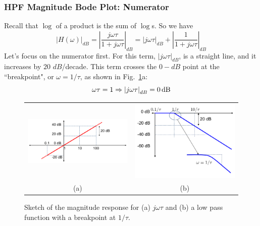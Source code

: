 \subsubsection{HPF Magnitude Bode Plot: Numerator}
Recall that $\log$ of a product is the sum of $\log$s.  So we have
    \begin{equation}
        {\left| {H(\omega )} \right|_{dB}} = {\left| {\frac{{j\omega \tau }}{{1 + j\omega \tau }}} \right|_{dB}} = {\left| {j\omega \tau } \right|_{dB}} + {\left| {\frac{1}{{1 + j\omega \tau }}} \right|_{dB}}
    \end{equation}
Let's focus on the numerator first.  For this term, $\left|j\omega \tau  \right|_{dB} $, is a straight line, and it increases by $20$ $dB$/decade.  This term crosses the $0-dB$ point at the ``breakpoint", or $\omega = 1/\tau$, as shown in Fig.~\ref{fig:hpfnumden}a:
    \begin{equation}
        \omega \tau  = 1 \Rightarrow {\left| {j\omega \tau } \right|_{dB}} = 0\,{\rm{dB}}
    \end{equation}
\begin{figure}[tb]
\begin{center}
\begin{tabular}{cc}
\includegraphics[width=.6\columnwidth]{mod1_3_9_bode1} &
\includegraphics[width=.4\columnwidth]{mod1_3_10_bode2} \\
(a) & (b) \\
\end{tabular}
\end{center}
\caption{Sketch of the magnitude response for (a) $j\omega \tau$ and (b) a low pass function with a breakpoint at $1/\tau$.}
\label{fig:hpfnumden}
\end{figure}
